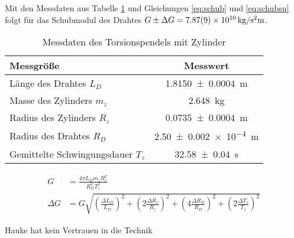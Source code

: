 Mit den Messdaten aus Tabelle \ref{tab:dataTZ} und Gleichungen \ref{eq:schub} und \ref{eq:schubsu} folgt für das Schubmodul  des Drahtes $G\pm \Delta G =\SI{7.87+-0.09e10}{kg \per \second \squared  \metre}$.
 
 
\begin{table}[h]
\centering	
\caption{Messdaten des Torsionspendels mit Zylinder  }
 \begin{tabular}{|l|c|} 
 	\hline 
 Messgröße	& Messwert  \\ 
 	\hline 
 	Länge des Drahtes $L_D$& \SI{1.8150\pm 0.0004 } {m} \\ 
 	\hline 
 	Masse des Zylinders $m_z$& \SI{2.648}{kg} \\ 
 	\hline 
 	Radius des Zylinders $R_z$ & \SI{0.0735 \pm 0.0004}{m}  \\ 
 	\hline 
 	Radius des Drahtes $R_D$ & \SI{2.50+-0.002 e-4} {m} \\ 
 	\hline 
 	Gemittelte Schwingungsdauer $T_z$&\SI{32.58+-0.04}{s}  \\ 
 	\hline 
 \end{tabular} 

	\label{tab:dataTZ}
\end{table} 




\begin{align}
	G&= \frac{4 \pi L_D m_z R_z^2}{R_D^4 T_z^2}
	\label{eq:schub}\\
	\Delta G &= G \sqrt{
		\left( \frac{\Delta L_D}{L_D} \right)^2+
		\left(2 \frac{\Delta R_z}{R_z} \right)^2+
		\left( 4 \frac{\Delta R_D}{R_D} \right)^2+
		\left( 2 \frac{\Delta T_z}{T_z} \right)^2 } \label{eq:schubsu}
\end{align}






Hauke hat kein Vertrauen in die Technik




